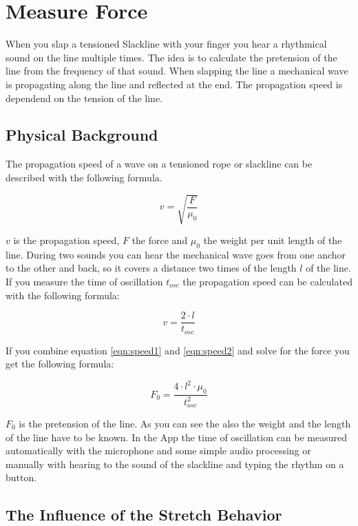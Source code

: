 \chapter{Measure Force}

When you slap a tensioned Slackline with your finger you hear a rhythmical sound on the line multiple times. The idea is to calculate the pretension of the line from the frequency of that sound. When slapping the line a mechanical wave is propagating along the line and reflected at the end. The propagation speed is dependend on the tension of the line.

\section{Physical Background}

The propagation speed of a wave on a tensioned rope or slackline can be described with the following formula.

\begin{equation}
v = \sqrt{\frac{F}{\mu_0}}
\label{eqn:speed1}
\end{equation}

$v$ is the propagation speed, $F$ the force and $\mu_0$ the weight per unit length of the line. During two sounds you can hear the mechanical wave goes from one anchor to the other and back, so it covers a distance two times of the length $l$ of the line. If you measure the time of oscillation $t_{osc}$ the propagation speed can be calculated with the following formula:

\begin{equation}
	v = \frac{2\cdot l}{t_{osc}}
	\label{eqn:speed2}
\end{equation}

If you combine equation \ref{eqn:speed1} and \ref{eqn:speed2} and solve for the force you get the following formula:

\begin{equation}
	F_0 = \frac{4\cdot l^2\cdot \mu_0}{t_{osc}^2}
	\label{eqn:measureForce}
\end{equation}

$F_0$ is the pretension of the line. As you can see the also the weight and the length of the line have to be known. In the App the time of oscillation can be measured automatically with the microphone and some simple audio processing or manually with hearing to the sound of the slackline and typing the rhythm on a button. 

\section{The Influence of the Stretch Behavior}

